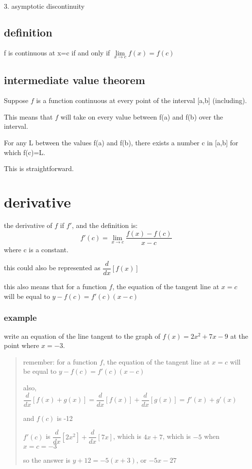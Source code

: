 \documentclass[11pt,a4paper]{article}
\begin{document}
3. asymptotic discontinuity

\subsection{definition}

f is continuous at x=c if and only if $\lim \limits_{x \to c}f(x) = f(c)$

\vspace{30pt}

\subsection{intermediate value theorem}

Suppose $f$ is a function continuous at every point of the interval [a,b] (including).

This means that $f$ will take on every value between f(a) and f(b) over the interval.

For any L between the values f(a) and f(b), there exists a number c in [a,b] for which f(c)=L.

This is straightforward.

\pagebreak

\section{derivative}

the derivative of $f$ if $f'$, and the definition is:
$$f'(c) = \lim \limits_{x \to c} \frac{f(x)-f(c)}{x-c}$$
where c is a constant.

this could also be represented as $\dfrac{d}{dx}\left[f(x)\right]$

\vspace{20pt}
this also means that for a function $f$, the equation of the tangent line at $x=c$ will be equal to $y-f(c)=f'(c)(x-c)$

\subsubsection{example}
write an equation of the line tangent to the graph of $f(x)=2x^2+7x-9$ at the point where $x=-3$.

\begin{quote}
  remember: for a function $f$, the equation of the tangent line at $x=c$ will be equal to $y-f(c)=f'(c)(x-c)$

  also, $\dfrac{d}{dx}\left[f(x)+g(x)\right] = \dfrac{d}{dx}\left[f(x)\right] +\dfrac{d}{dx}\left[g(x)\right] = f'(x) + g'(x)$

  and $f(c)$ is -12

  $f'(c)$ is $\dfrac{d}{dx}\left[2x^2\right]+\dfrac{d}{dx}\left[7x\right]$, which is $4x+7$, which is $-5$ when $x=c=-3$

  so the answer is $y+12=-5(x+3)$, or $-5x-27$
\end{quote}
\end{document}
